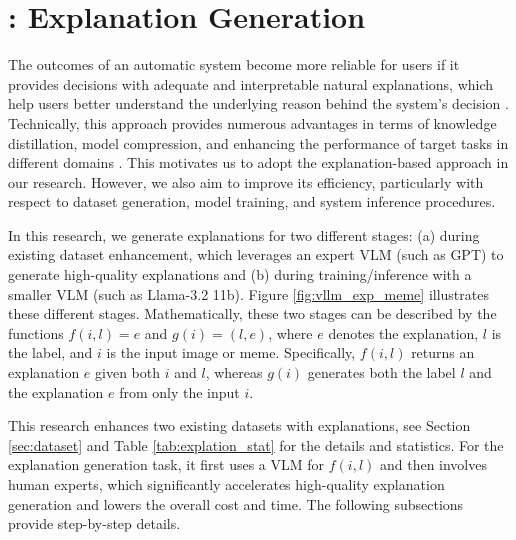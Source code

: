 \section{\memex{}: Explanation Generation}
\label{sec:experiments_expl}
%
The outcomes of an automatic system become more reliable for users if it provides decisions with adequate and interpretable natural explanations, which help users better understand the underlying reason behind the system’s decision \cite{hee2023decoding, yang2023hare, huang_chain_2023, sun_text_2023}. Technically, this approach provides numerous advantages in terms of knowledge distillation, model compression, and enhancing the performance of target tasks in different domains \cite{li2022explanations, magister2022teaching, nandi2024safe, kumari2024m3hop}. This motivates us to adopt the explanation-based approach in our research. However, we also aim to improve its efficiency, particularly with respect to dataset generation, model training, and system inference procedures.
%

In this research, we generate explanations for two different stages: 
(a) during existing dataset enhancement, which leverages an expert 
VLM (such as GPT) to generate high-quality explanations and 
(b) during training/inference with a smaller VLM (such as Llama-3.2 11b). 
Figure \ref{fig:vllm_exp_meme} illustrates these different stages.
%
Mathematically, these two stages can be described by the functions
$f(i, l)=e$ and $g(i)=(l,e)$, where \( e \) denotes the explanation, 
\( l \) is the label, and \( i \) is the input image or meme. 
Specifically, \( f(i, l) \) returns an explanation \( e \) 
given both \( i \) and \( l \), whereas \( g(i) \) generates both 
the label \( l \) and the explanation \( e \) from only the input \( i \).
%
%

This research enhances two existing datasets with explanations, see Section \ref{sec:dataset} and Table \ref{tab:explation_stat} for the details and statistics. For the explanation generation task, it first uses a VLM for \( f(i, l) \) and then involves human experts, which significantly accelerates high-quality explanation generation and lowers the overall cost and time. The following subsections provide step-by-step details.
%

